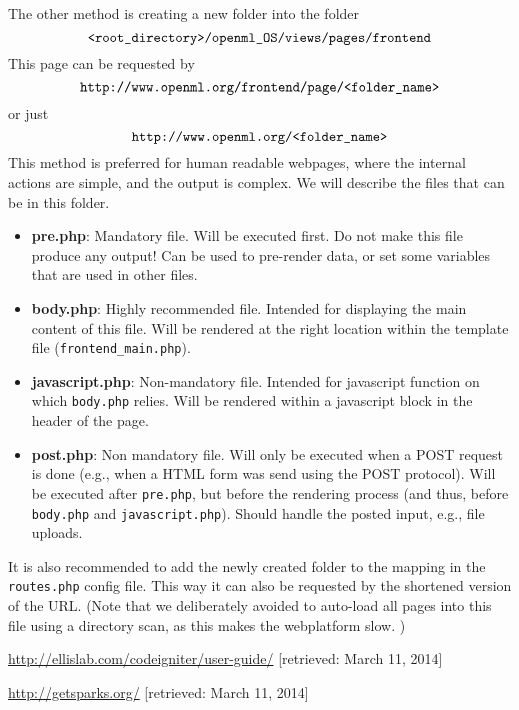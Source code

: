 \documentclass[10pt]{article}
\begin{document}
The other method is creating a new folder into the folder
$$\texttt{\textless root\_directory\textgreater /openml\_OS/views/pages/frontend}$$
This page can be requested by
$$\texttt{http://www.openml.org/frontend/page/\textless folder\_name\textgreater}$$
or just
$$\texttt{http://www.openml.org/\textless folder\_name\textgreater}$$
This method is preferred for human readable webpages, where the internal actions are simple, and the output is complex. We will describe the files that can be in this folder.
\begin{itemize}
  \item \textbf{pre.php}: Mandatory file. Will be executed first. Do not make this file produce any output! Can be used to pre-render data, or set some variables that are used in other files. 
  \item \textbf{body.php}: Highly recommended file. Intended for displaying the main content of this file. Will be rendered at the right location within the template file (\texttt{frontend\_main.php}).
  \item \textbf{javascript.php}: Non-mandatory file. Intended for javascript function on which \texttt{body.php} relies. Will be rendered within a javascript block in the header of the page.
  \item \textbf{post.php}: Non mandatory file. Will only be executed when a POST request is done (e.g., when a HTML form was send using the POST protocol).  Will be executed after \texttt{pre.php}, but before the rendering process (and thus, before \texttt{body.php} and \texttt{javascript.php}). Should handle the posted input, e.g., file uploads. 
\end{itemize}
It is also recommended to add the newly created folder to the mapping in the \texttt{routes.php} config file. This way it can also be requested by the shortened version of the URL. (Note that we deliberately avoided to auto-load all pages into this file using a directory scan, as this makes the webplatform slow. )


\begin{thebibliography}{9}

	\url{http://ellislab.com/codeigniter/user-guide/} [retrieved: March 11, 2014]

	\url{http://getsparks.org/} [retrieved: March 11, 2014]

\end{thebibliography}
\end{document}
